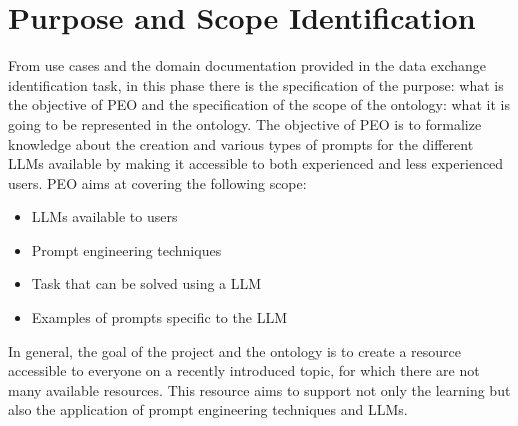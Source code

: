 \section{Purpose and Scope Identification}
From use cases and the domain documentation provided in the data exchange identification task, in this phase there is the specification of the purpose: what is the objective of PEO and the specification of the scope of the ontology: what it is going to be represented in the ontology.
The objective of PEO is to formalize knowledge about the creation and various types of prompts for the different LLMs available by making it accessible to both experienced and less experienced users.
PEO aims at covering the following scope:
\begin{itemize}
    \item LLMs available to users
    \item Prompt engineering techniques
    \item Task that can be solved using a LLM
    \item Examples of prompts specific to the LLM
\end{itemize}
In general, the goal of the project and the ontology is to create a resource accessible to everyone on a recently introduced topic, for which there are not many available resources.
This resource aims to support not only the learning but also the application of prompt engineering techniques and LLMs.


